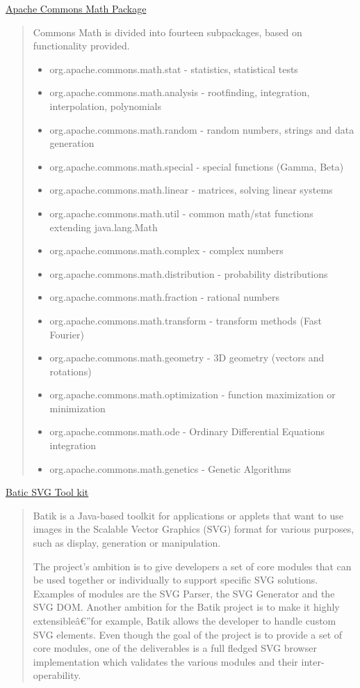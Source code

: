 \documentclass[11pt,a4paper,oneside]{report}
\begin{document}
\href{http://commons.apache.org/math/}{Apache Commons Math Package}
\begin{shaded}
\begin{quote}
Commons Math is divided into fourteen subpackages, based on functionality provided.
\begin{itemize}
\item org.apache.commons.math.stat - statistics, statistical tests
\item org.apache.commons.math.analysis - rootfinding, integration, interpolation, polynomials
\item org.apache.commons.math.random - random numbers, strings and data generation
\item org.apache.commons.math.special - special functions (Gamma, Beta)
\item org.apache.commons.math.linear - matrices, solving linear systems
\item org.apache.commons.math.util - common math/stat functions extending java.lang.Math
\item org.apache.commons.math.complex - complex numbers
\item org.apache.commons.math.distribution - probability distributions
\item org.apache.commons.math.fraction - rational numbers
\item org.apache.commons.math.transform - transform methods (Fast Fourier)
\item org.apache.commons.math.geometry - 3D geometry (vectors and rotations)
\item org.apache.commons.math.optimization - function maximization or minimization
\item org.apache.commons.math.ode - Ordinary Differential Equations integration
\item org.apache.commons.math.genetics - Genetic Algorithms
\end{itemize}
\end{quote}
\end{shaded}

\href{http://xmlgraphics.apache.org/batik/}{Batic SVG Tool kit}
\begin{shaded}
\begin{quote}
Batik is a Java-based toolkit for applications or applets that want to use images in the Scalable Vector Graphics (SVG) format for various purposes, such as display, generation or manipulation.

The project's ambition is to give developers a set of core modules that can be used together or individually to support specific SVG solutions. Examples of modules are the SVG Parser, the SVG Generator and the SVG DOM. Another ambition for the Batik project is to make it highly extensibleâ€”for example, Batik allows the developer to handle custom SVG elements. Even though the goal of the project is to provide a set of core modules, one of the deliverables is a full fledged SVG browser implementation which validates the various modules and their inter-operability.
\end{quote}
\end{shaded}
\end{document}
